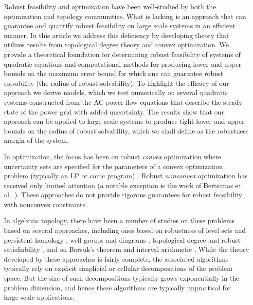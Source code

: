 Robust feasibility and optimization have been well-studied by both the optimization and topology communities. 
What is lacking is an approach that can guarantee and quantify robust feasibility on large scale systems in an efficient manner. 
In this article we address this deficiency by developing theory that utilizes results from topological degree theory and convex optimization. 
We provide a theoretical foundation for determining robust feasibility of systems of quadratic equations and computational methods for producing lower and upper bounds on the maximum error bound for which one can guarantee robust solvability (the radius of robust solvability). 
To highlight the efficacy of our approach we derive models, which we test numerically on several quadratic systems constructed from the AC power flow equations that describe the steady state of the power grid with added uncertainty. 
The results show that our approach can be applied to large scale systems to produce tight lower and upper bounds on the radius of robust solvability, which we shall define as the robustness margin of the system.

In optimization, the focus has been on robust \emph{convex} optimization where uncertainty sets are specified for the parameters of a convex optimization problem (typically an LP or conic program) \cite{ben2009robust}.
Robust \emph{nonconvex} optimization has received only limited attention (a notable exception is the work of Bertsimas et al.~\cite{BeNoTe2010}).
These approaches do not provide rigorous guarantees for robust feasibility with nonconvex constraints.

In algebraic topology, there have been a number of studies on these problems based on several approaches, including ones based on robustness of level sets and persistent homology \cite{BeEdMoPa2010,EdMoPa2011}, well groups and diagrams \cite{ChSkPa2012,FrKr2016well,FrKr2016pers}, topological degree and robust satisfiability \cite{FrKr2015,FrKrWa2016},  and on Borsuk's theorem and interval arithmetic \cite{FrRa2015,FrHoLa2007,FrLa2005}.
While the theory developed by these approaches is fairly complete, the associated algorithms typically rely on explicit simplicial or cellular decompositions of the problem space.
But the size of such decompositions typically grows exponentially in the problem dimension, and hence these algorithms are typically impractical for large-scale applications.

